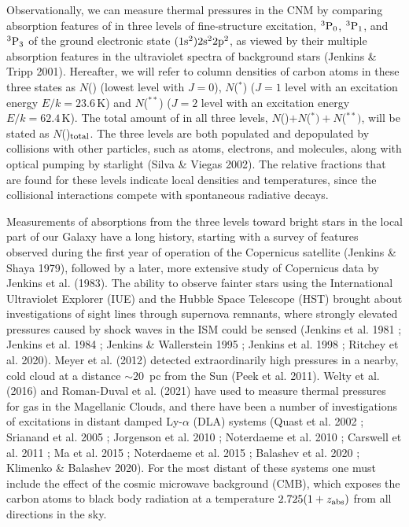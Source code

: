 \documentclass[modern]{aastex63}
\begin{document}
Observationally, we can measure thermal pressures in the CNM by comparing absorption 
features of  in three levels of fine-structure excitation, $^3{\rm P}_0$, $^3{\rm P}_1$, 
and $^3{\rm P}_3$ of the ground electronic state ${\rm (1s^2)2s^22p^2}$, as viewed by their 
multiple absorption features in the ultraviolet spectra of background stars (Jenkins \& Tripp 
2001).  Hereafter, we will refer to column densities of carbon atoms in these three states as 
$N$() (lowest 
level with $J=0$), $N$($^*$) ($J=1$ level with an excitation energy $E/k=23.6$\,K) 
and $N$($^{**}$) ($J=2$ level with an excitation energy $E/k=62.4$\,K).  The total 
amount of  in all three levels, 
$N$()$+N$($^*)+N$($^{**})$, will be stated as 
$N$()$_{\rm total}$.  The three levels are both populated and depopulated by 
collisions with other particles, such as atoms, electrons, and molecules, along with optical 
pumping by starlight (Silva \& Viegas 2002).  The relative fractions that are found for these 
levels indicate local densities and temperatures, since the collisional interactions compete with 
spontaneous radiative decays.

Measurements of  absorptions from the three levels toward bright stars in the local 
part of our Galaxy have a long history, starting with a survey of  features observed 
during the first year of operation of the Copernicus satellite (Jenkins \& Shaya 1979), followed 
by a later, more extensive study of Copernicus data by Jenkins et al. (1983).  The ability to 
observe fainter stars using the International Ultraviolet Explorer (IUE) and the Hubble Space 
Telescope (HST) brought about investigations of sight lines through supernova remnants, where 
strongly elevated pressures caused by shock waves in the ISM could be sensed  (Jenkins et al. 
1981 ; Jenkins et al. 1984 ; Jenkins \& Wallerstein 1995 ; Jenkins et al. 1998 ; Ritchey et al. 
2020).   Meyer et al. (2012) detected extraordinarily high pressures in a nearby, cold cloud at a 
distance $\sim 20$~pc from the Sun (Peek et al. 2011).  Welty et al. (2016) and Roman-Duval et 
al. (2021) have used  to measure thermal pressures for gas in the Magellanic Clouds, 
and there have been a number of investigations of  excitations in distant damped Ly-$\alpha$
(DLA) systems (Quast et al. 2002 ; Srianand et al. 2005 ; Jorgenson et al. 2010 ; 
Noterdaeme et al. 2010 ; Carswell et al. 2011 ; Ma et al. 2015 ; Noterdaeme et al. 2015 ; 
Balashev et al. 2020 ; Klimenko \& Balashev 2020).  For the most distant of these systems one 
must include the effect of the cosmic microwave background (CMB), which exposes the carbon 
atoms to black body radiation at a temperature $2.725(1+z_{\rm abs})$ from all directions in 
the sky.
\end{document}
